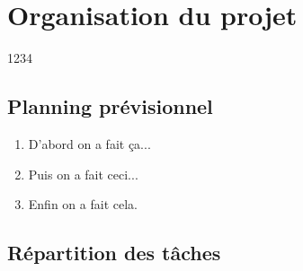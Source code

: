 \documentclass[11pt,a4paper]{article}
\begin{document}
\section{Organisation du projet}

1234

\subsection{Planning prévisionnel}

\begin{enumerate}
\item D'abord on a fait ça...
\item Puis on a fait ceci...
\item Enfin on a fait cela.
\end{enumerate}

\subsection{Répartition des tâches}
\end{document}
